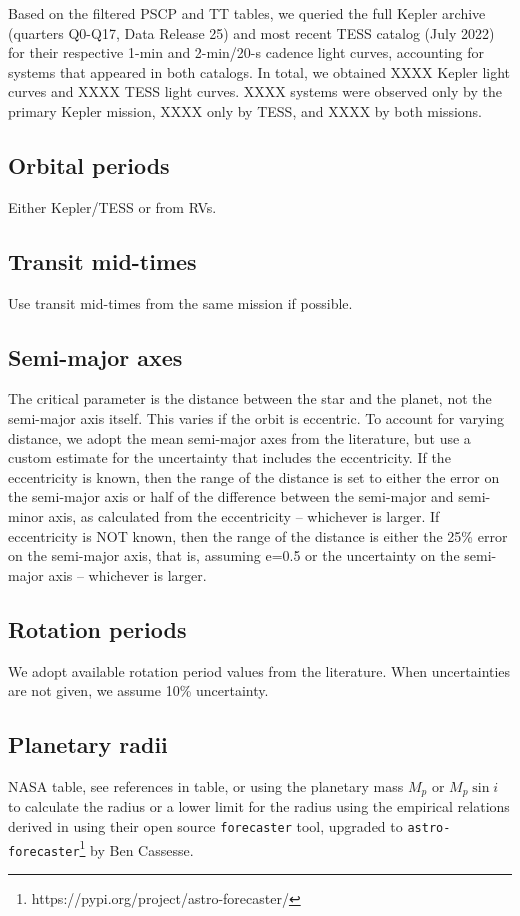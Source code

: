 \documentclass[twocolumn]{aastex631}
\begin{document}
Based on the filtered PSCP and TT tables, we queried the full Kepler archive (quarters Q0-Q17, Data Release 25) and most recent TESS catalog (July 2022) for their respective 1-min and 2-min/20-s cadence light curves, accounting for systems that appeared in both catalogs. In total, we obtained XXXX Kepler light curves and XXXX TESS light curves. XXXX systems were observed only by the primary Kepler mission, XXXX only by TESS, and XXXX by both missions.


\subsection{Orbital periods}
Either Kepler/TESS or from RVs.
\subsection{Transit mid-times}
Use transit mid-times from the same mission if possible.
\subsection{Semi-major axes}
\label{sec:data:a}
The critical parameter is the distance between the star and the planet, not the semi-major axis itself. This varies if the orbit is eccentric. To account for varying distance, we adopt the mean semi-major axes from the literature, but use a custom estimate for the uncertainty that includes the eccentricity.
If the eccentricity is known, then the range of the distance is set to either the error on the semi-major axis or half of the difference between the semi-major and semi-minor axis, as calculated from the eccentricity -- whichever is larger. If eccentricity is NOT known, then the range of the distance is either the 25\% error on the semi-major axis, that is, assuming e=0.5 or the uncertainty on the semi-major axis -- whichever is larger.

\subsection{Rotation periods}
We adopt available rotation period values from the literature. When uncertainties are not given, we assume 10\% uncertainty.%

\subsection{Planetary radii}
NASA table, see references in table, or using the planetary mass $M_p$ or $M_p\sin i$ to calculate the radius or a lower limit for the radius using the empirical relations derived in \cite{chen2017probabilistic} using their open source \texttt{forecaster} tool, upgraded to \texttt{astro-forecaster}\footnote{https://pypi.org/project/astro-forecaster/} by Ben Cassesse. 
\end{document}
